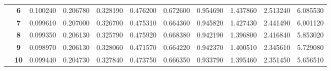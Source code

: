 \begin{table}[h]
{\begin{tabular}{ccccccccccc}
\multicolumn{1}{c|}{} & \multicolumn{1}{c|}{\textbf{6}} & \multicolumn{1}{c|}{0.100240} & \multicolumn{1}{c|}{0.206780} & \multicolumn{1}{c|}{0.328190} & \multicolumn{1}{c|}{0.476200} & \multicolumn{1}{c|}{0.672600} & \multicolumn{1}{c|}{0.954690} & \multicolumn{1}{c|}{1.437860} & \multicolumn{1}{c|}{2.513240} & \multicolumn{1}{c|}{6.085530} \\ \cline{2-11}
\multicolumn{1}{c|}{} & \multicolumn{1}{c|}{\textbf{7}} & \multicolumn{1}{c|}{0.099610} & \multicolumn{1}{c|}{0.207000} & \multicolumn{1}{c|}{0.326700} & \multicolumn{1}{c|}{0.475310} & \multicolumn{1}{c|}{0.664360} & \multicolumn{1}{c|}{0.945820} & \multicolumn{1}{c|}{1.427430} & \multicolumn{1}{c|}{2.441490} & \multicolumn{1}{c|}{6.001120} \\ \cline{2-11}
\multicolumn{1}{c|}{} & \multicolumn{1}{c|}{\textbf{8}} & \multicolumn{1}{c|}{0.099350} & \multicolumn{1}{c|}{0.206130} & \multicolumn{1}{c|}{0.325790} & \multicolumn{1}{c|}{0.475920} & \multicolumn{1}{c|}{0.668380} & \multicolumn{1}{c|}{0.942190} & \multicolumn{1}{c|}{1.396800} & \multicolumn{1}{c|}{2.416840} & \multicolumn{1}{c|}{5.853020} \\ \cline{2-11}
\multicolumn{1}{c|}{} & \multicolumn{1}{c|}{\textbf{9}} & \multicolumn{1}{c|}{0.098970} & \multicolumn{1}{c|}{0.206130} & \multicolumn{1}{c|}{0.328060} & \multicolumn{1}{c|}{0.471570} & \multicolumn{1}{c|}{0.664220} & \multicolumn{1}{c|}{0.942370} & \multicolumn{1}{c|}{1.400510} & \multicolumn{1}{c|}{2.345610} & \multicolumn{1}{c|}{5.729080} \\ \cline{2-11}
\multicolumn{1}{c|}{} & \multicolumn{1}{c|}{\textbf{10}} & \multicolumn{1}{c|}{0.099440} & \multicolumn{1}{c|}{0.204730} & \multicolumn{1}{c|}{0.327840} & \multicolumn{1}{c|}{0.473750} & \multicolumn{1}{c|}{0.666350} & \multicolumn{1}{c|}{0.933790} & \multicolumn{1}{c|}{1.395460} & \multicolumn{1}{c|}{2.351450} & \multicolumn{1}{c|}{5.656510} \\ \cline{2-11}
\end{tabular}%
}
\end{table}

